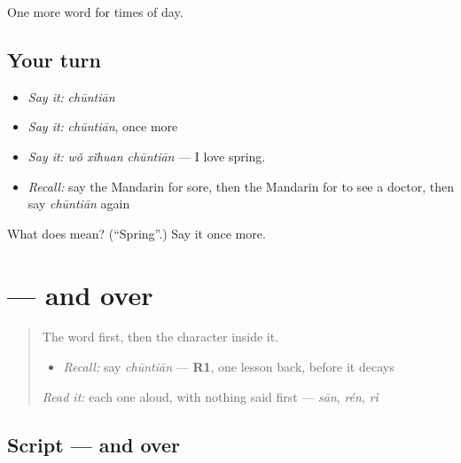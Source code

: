 \begin{grammarlens}[title={What you've built}]
One more word for times of day.
\end{grammarlens}

\subsection*{Your turn}
\begin{itemize}
\raggedright
  \item \emph{Say it:} \emph{chūntiān}
  \item \emph{Say it:} \emph{chūntiān}, once more
  \item \emph{Say it:} \emph{wǒ xǐhuan chūntiān} — I love spring.
  \item \emph{Recall:} say the Mandarin for sore, then the Mandarin for to see a doctor, then say \emph{chūntiān} again
\end{itemize}

\begin{tcolorbox}[breakable,colback=teal!4,colframe=teal!35!black,title={Before you move on}]
What does  mean? (\textquotedblleft{}Spring\textquotedblright{}.) Say it once more.
\end{tcolorbox}
\section[\texorpdfstring{\zh{春} (chūn)}{春 (chūn)}]{ —  and  over }

\label{lesson:ZH-W131-chun-spring}



\begin{quote}
The word first, then the character inside it.

\begin{itemize}
\raggedright
  \item \emph{Recall:} say \emph{chūntiān} — \textbf{R1}, one lesson back, before it decays
\end{itemize}

\begin{quote}
  
\end{quote}

\emph{Read it:} each one aloud, with nothing said first — \emph{sān}, \emph{rén}, \emph{rì}
\end{quote}

\subsection*{Script —  and  over }

